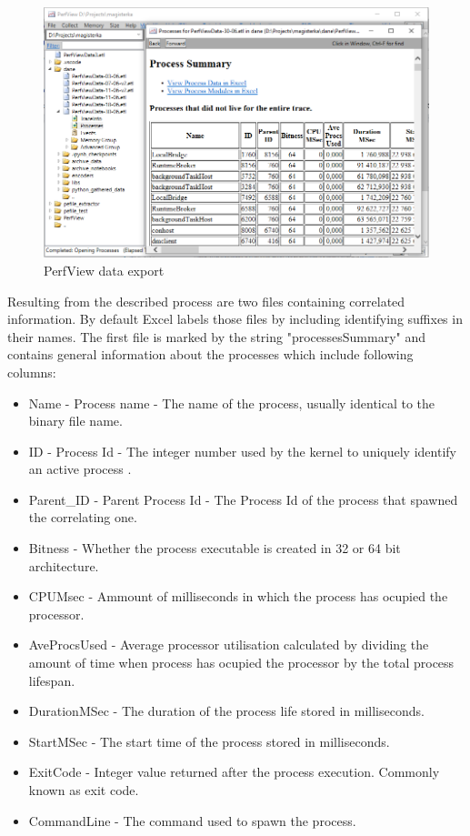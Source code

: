 \documentclass[a4paper,twoside,12pt]{book}
\begin{document}
\begin{figure}
	\centering
	\includegraphics[scale=0.55]{images/perf_export}
	\caption{PerfView data export}
	\label{fig:PerfViewexport}
 \end{figure}

Resulting from the described process are two files containing correlated information. By 
default Excel labels those files by including identifying suffixes in their names. The 
first file is marked by the string "processesSummary" and contains general information 
about the processes which include following columns:
\begin{itemize}
	\item Name - Process name - The name of the process, usually identical to the binary 
	file name.
	\item ID - Process Id - The integer number used by the kernel to uniquely identify 
	an active process \cite{bib:MicrosoftWinInternals}.
	\item Parent\_ID - Parent Process Id - The Process Id of the process that spawned the 
	correlating one.
	\item Bitness - Whether the process executable is created in 32 or 64 bit architecture.
	\item CPUMsec - Ammount of milliseconds in which the process has ocupied the processor. 
	\item AveProcsUsed - Average processor utilisation calculated by dividing the amount
	of time when process has ocupied the processor by the total process lifespan. 
	\item DurationMSec - The duration of the process life stored in milliseconds.
	\item StartMSec - The start time of the process stored in milliseconds.
	\item ExitCode - Integer value returned after the process execution. Commonly known as 
	exit code.
	\item CommandLine - The command used to spawn the process.
\end{itemize}
\end{document}
